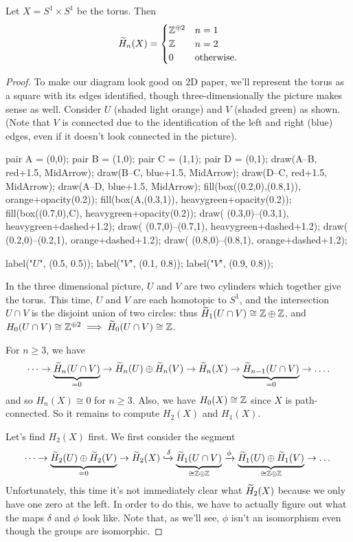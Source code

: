 \begin{proposition}
	Let $X = S^1 \times S^1$ be the torus.
	Then
	\[
		\widetilde H_n(X)
		=
		\begin{cases}
			\mathbb Z^{\oplus 2} & n = 1 \\
			\mathbb Z & n = 2 \\
			0 & \text{otherwise}.
		\end{cases}
	\]
\end{proposition}
\begin{proof}
	To make our diagram look good on 2D paper,
	we'll represent the torus as a square with its edges identified,
	though three-dimensionally the picture makes sense as well.
	Consider $U$ (shaded light orange) and $V$ (shaded green) as shown.
	(Note that $V$ is connected due to the identification of the left and right (blue) edges,
	even if it doesn't look connected in the picture).
	\begin{center}
		\begin{asy}
			pair A = (0,0);
			pair B = (1,0);
			pair C = (1,1);
			pair D = (0,1);
			draw(A--B, red+1.5, MidArrow);
			draw(B--C, blue+1.5, MidArrow);
			draw(D--C, red+1.5, MidArrow);
			draw(A--D, blue+1.5, MidArrow);
			fill(box((0.2,0),(0.8,1)), orange+opacity(0.2));
			fill(box(A,(0.3,1)), heavygreen+opacity(0.2));
			fill(box((0.7,0),C), heavygreen+opacity(0.2));
			draw( (0.3,0)--(0.3,1), heavygreen+dashed+1.2);
			draw( (0.7,0)--(0.7,1), heavygreen+dashed+1.2);
			draw( (0.2,0)--(0.2,1), orange+dashed+1.2);
			draw( (0.8,0)--(0.8,1), orange+dashed+1.2);

			label("$U$", (0.5, 0.5));
			label("$V$", (0.1, 0.8));
			label("$V$", (0.9, 0.8));
		\end{asy}
	\end{center}
	In the three dimensional picture, $U$ and $V$ are two cylinders which together give the torus.
	This time, $U$ and $V$ are each homotopic to $S^1$, and the intersection $U \cap V$
	is the disjoint union of two circles: thus $\widetilde H_1(U \cap V) \cong \mathbb Z \oplus \mathbb Z$,
	and $H_0(U \cap V) \cong \mathbb Z^{\oplus 2} \implies \widetilde H_0(U \cap V) \cong \mathbb Z$.

	For $n \ge 3$, we have
	\[ 
		\dots \to
		\underbrace{\widetilde H_n(U \cap V)}_{=0}
		\to \widetilde H_n(U) \oplus \widetilde H_n(V) \to \widetilde H_n(X) \to 
		\underbrace{\widetilde H_{n-1}(U \cap V)}_{=0} \to \dots.
	\]
	and so $H_n(X) \cong 0$ for $n \ge 3$.
	Also, we have $H_0(X) \cong \mathbb Z$ since $X$ is path-connected.
	So it remains to compute $H_2(X)$ and $H_1(X)$.

	Let's find $H_2(X)$ first.
	We first consider the segment
	\[ 
		\dots \to
		\underbrace{\widetilde H_2(U) \oplus \widetilde H_2(V)}_{=0} \to \widetilde H_2(X) \xhookrightarrow{\delta}
		\underbrace{\widetilde H_1(U \cap V)}_{\cong \mathbb Z \oplus \mathbb Z} \xrightarrow{\phi}
		\underbrace{\widetilde H_1(U) \oplus \widetilde H_1(V)}_{\cong \mathbb Z \oplus \mathbb Z} \to \dots
	\]
	Unfortunately, this time it's not immediately clear what $\widetilde H_2(X)$ because
	we only have one zero at the left.
	In order to do this, we have to actually figure out what the maps $\delta$ and $\phi$ look like.
	Note that, as we'll see, $\phi$ isn't an isomorphism even though the groups are isomorphic.


\end{proof}
